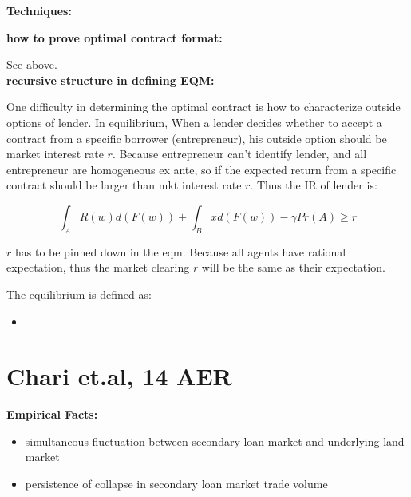 \documentclass{book}
\theoremstyle{plain}
\theoremstyle{definition}
\begin{document}
\noindent
\textbf{Techniques:}

\textbf{how to prove optimal contract format:}

See above.\\

\textbf{recursive structure in defining EQM:}

One difficulty in determining the optimal contract is how to characterize outside options of lender. In equilibrium, When a lender decides whether to accept a contract from a specific borrower (entrepreneur), his outside option should be market interest rate $r$. Because entrepreneur can't identify lender, and all entrepreneur are homogeneous ex ante, so if the expected return from a specific contract should be larger than mkt interest rate $r$. Thus the IR of lender is:

\[\int_A R(w)d(F(w))+\int_B xd(F(w))-\gamma Pr(A) \geq r\]

$r$ has to be pinned down in the eqm. Because all agents have rational expectation, thus the market clearing $r$ will be the same as their expectation.

The equilibrium is defined as:
\begin{itemize}
	\item 
\end{itemize}




\section{Chari et.al, 14 AER} %
\label{sec:chari_et_al_14_aer}

\textbf{}

\vspace{3mm}
\noindent
\textbf{Empirical Facts:}
\begin{itemize}
 	\item simultaneous fluctuation between secondary loan market and underlying land market
 	\item persistence of collapse in secondary loan market trade volume
 \end{itemize}
\end{document}
